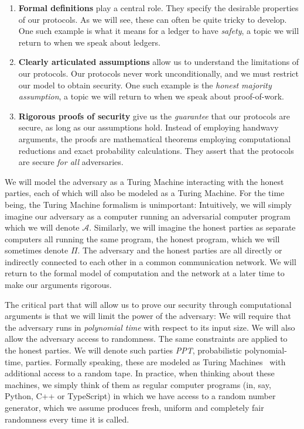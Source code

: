 \begin{enumerate}
  \item \textbf{Formal definitions} play a central role. They specify the
        desirable properties of our protocols. As we will see, these can often
        be quite tricky to develop. One such example is what it means for a
        ledger to have \emph{safety}, a topic we will return to when we speak
        about ledgers.
  \item \textbf{Clearly articulated assumptions} allow us to understand the
        limitations of our protocols. Our protocols never work
        unconditionally, and we must restrict our model to obtain security. One
        such example is the \emph{honest majority assumption}, a topic we will
        return to when we speak about proof-of-work.
  \item \textbf{Rigorous proofs of security} give us the \emph{guarantee} that
        our protocols are secure, as long as our assumptions hold. Instead of
        employing handwavy arguments, the proofs are mathematical theorems
        employing computational reductions and exact probability calculations.
        They assert that the protocols are secure \emph{for all} adversaries.
\end{enumerate}

We will model the adversary as a Turing Machine interacting
with the honest parties, each of which will also be modeled as a Turing Machine. For the
time being, the Turing Machine formalism is unimportant: Intuitively, we will simply imagine
our adversary as a computer running an adversarial computer program which we will denote $\mathcal{A}$.
Similarly, we will imagine the honest parties as separate computers all running the same program,
the honest program, which we will sometimes denote $\Pi$.
The adversary and the honest parties are
all directly or indirectly connected to each other in a common communication network.
We will return to the formal model of computation and the network at a later time to make
our arguments rigorous.

The critical part that will allow us to prove our security through computational arguments
is that we will limit the power of the adversary: We will require that the adversary runs
in \emph{polynomial time} with respect to its input size. We will also allow the adversary
access to randomness. The same constraints are applied to the honest parties. We will
denote such parties \emph{PPT}, probabilistic polynomial-time, parties. Formally speaking,
these are modeled as Turing Machines~\cite{turing} with additional access to a random tape.
In practice, when thinking about these machines, we simply think of them as regular computer
programs (in, say, Python, C++ or TypeScript) in which we have access to a random number
generator, which we assume produces fresh, uniform and completely fair randomness every time
it is called.

